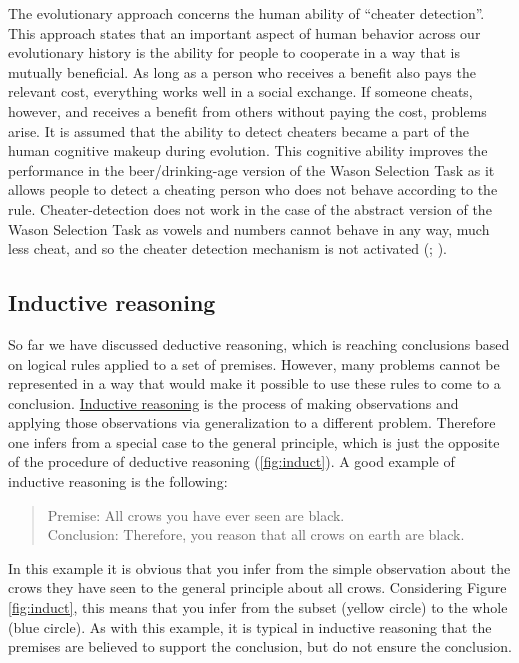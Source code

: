 \documentclass[
]{krantz}
\begin{document}
The evolutionary approach concerns the human ability of ``cheater detection''. This approach states that an important aspect of human behavior across our evolutionary history is the ability for people to cooperate in a way that is mutually beneficial. As long as a person who receives a benefit also pays the relevant cost, everything works well in a social exchange. If someone cheats, however, and receives a benefit from others without paying the cost, problems arise. It is assumed that the ability to detect cheaters became a part of the human cognitive makeup during evolution. This cognitive ability improves the performance in the beer/drinking-age version of the Wason Selection Task as it allows people to detect a cheating person who does not behave according to the rule. Cheater-detection does not work in the case of the abstract version of the Wason Selection Task as vowels and numbers cannot behave in any way, much less cheat, and so the cheater detection mechanism is not activated (; ).

\subsection{Inductive reasoning}\label{inductive-reasoning}

So far we have discussed deductive reasoning, which is reaching conclusions based on logical rules applied to a set of premises. However, many problems cannot be represented in a way that would make it possible to use these rules to come to a conclusion. \hyperref[inductive-reasoning]{Inductive reasoning} is the process of making observations and applying those observations via generalization to a different problem. Therefore one infers from a special case to the general principle, which is just the opposite of the procedure of deductive reasoning (\ref{fig:induct}). A good example of inductive reasoning is the following:

\begin{quote}
Premise: All crows you have ever seen are black.\\
Conclusion: Therefore, you reason that all crows on earth are black.
\end{quote}

In this example it is obvious that you infer from the simple observation about the crows they have seen to the general principle about all crows. Considering Figure \ref{fig:induct}, this means that you infer from the subset (yellow circle) to the whole (blue circle). As with this example, it is typical in inductive reasoning that the premises are believed to support the conclusion, but do not ensure the conclusion.
\end{document}
